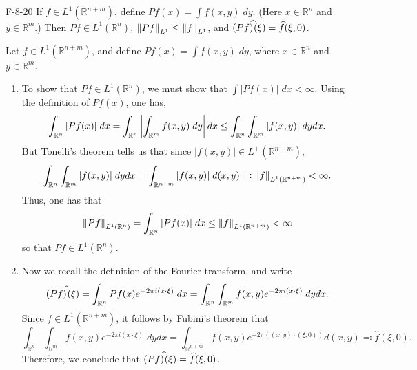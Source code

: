 \documentclass{article}
\begin{document}
	\begin{prb}{F-8-20}
		If $f \in L^{1}(\mathbb{R}^{n + m})$, define $Pf(x) = \int f(x,y)\;dy$. (Here $x \in \mathbb{R}^{n}$ and $y \in \mathbb{R}^{m}$.) Then $Pf \in L^{1}(\mathbb{R}^{n})$, $\left\Vert Pf \right\Vert_{L^{1}} \leq \left\Vert f \right\Vert_{L^{1}}$, and $(Pf)^{\widehat{}}(\xi) = \widehat{f}(\xi,0)$. 
	\end{prb}
	Let $f \in L^{1}(\mathbb{R}^{n + m})$, and define $Pf(x) = \int f(x,y)\;dy$, where $x \in \mathbb{R}^{n}$ and $y \in \mathbb{R}^{m}$. 
	\begin{enumerate}[itemsep =-2pt,label = (\arabic{*})]
		\item To show that $Pf \in L^{1}(\mathbb{R}^{n})$, we must show that $\int |Pf(x)|\;dx < \infty$. Using the definition of $Pf(x)$, one has, 
		\begin{equation*}
			\int_{\mathbb{R}^{n}} |Pf(x)|\;dx = \int_{\mathbb{R}^{n}}\left| \int_{\mathbb{R}^{m}}f(x,y)\;dy \right|dx \leq \int_{\mathbb{R}^{n}}\int_{\mathbb{R}^{m}}|f(x,y)|\;dydx. 
		\end{equation*} 
		But Tonelli's theorem tells us that since $|f(x,y)| \in L^{+}(\mathbb{R}^{n + m})$, 
		\begin{equation*}
			\int_{\mathbb{R}^{n}}\int_{\mathbb{R}^{m}}|f(x,y)|\;dydx = \int_{\mathbb{R}^{n + m}}|f(x,y)|\;d(x,y) \eqqcolon \left\Vert f \right\Vert_{L^{1}(\mathbb{R}^{n + m})} < \infty. 
		\end{equation*}
		Thus, one has that 
		\begin{equation*}
			\left\Vert Pf \right\Vert_{L^{1}(\mathbb{R}^{n})} = \int_{\mathbb{R}^{n}}|Pf(x)|\;dx \leq \left\Vert f \right\Vert_{L^{1}(\mathbb{R}^{n + m})} < \infty 
		\end{equation*}
		so that $Pf \in L^{1}(\mathbb{R}^{n})$. 
		\item Now we recall the definition of the Fourier transform, and write 
		\begin{equation*}
			(Pf)^{\widehat{}}(\xi) = \int_{\mathbb{R}^{n}}Pf(x)e^{-2\pi i (x \cdot \xi)}\;dx = \int_{\mathbb{R}^{n}}\int_{\mathbb{R}^{m}}f(x,y)e^{-2\pi i (x \cdot \xi)}\;dydx. 
		\end{equation*}
		Since $f \in L^{1}(\mathbb{R}^{n + m})$, it follows by Fubini's theorem that 
		\begin{equation*}
			\int_{\mathbb{R}^{n}}\int_{\mathbb{R}^{m}}f(x,y)e^{-2\pi i (x \cdot \xi)}\;dydx = \int_{\mathbb{R}^{n + m}}f(x,y)e^{-2\pi ((x,y) \cdot (\xi,0))}d(x,y) \eqqcolon \hat{f}(\xi,0). 
		\end{equation*}
		Therefore, we conclude that $(Pf)^{\widehat{}}(\xi) = \widehat{f}(\xi,0)$. 
	\end{enumerate}
	
\end{document}
